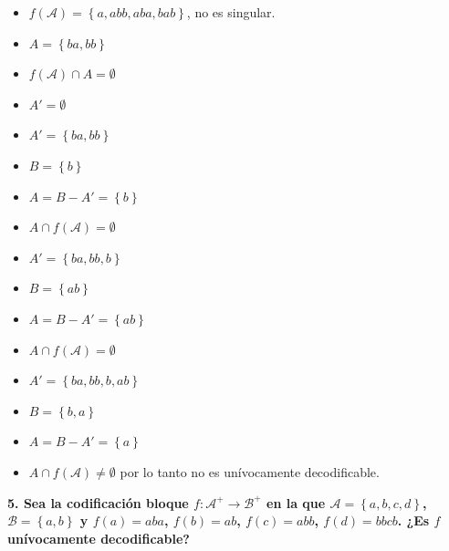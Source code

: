 \documentclass{article}
\begin{document}
\begin{itemize}
    \item $f\left(\mathcal{A}\right)=\left\{a,abb,aba,bab\right\}$, no es singular.
    \item $A=\left\{ba, bb\right\}$
    \item $f\left(\mathcal{A}\right)\cap A = \emptyset$
    \item $A'=\emptyset$
    \item $A'=\left\{ba, bb\right\}$
    \item $B = \left\{b\right\}$
    \item $A = B-A' = \left\{b\right\}$
    \item $A\cap f\left(\mathcal{A}\right) = \emptyset$
    \item $A'=\left\{ba, bb, b\right\}$
    \item $B = \left\{ab\right\}$
    \item $A = B-A' = \left\{ab\right\}$
    \item $A\cap f\left(\mathcal{A}\right) = \emptyset$
    \item $A'=\left\{ba, bb, b, ab\right\}$
    \item $B = \left\{b, a\right\}$
    \item $A = B - A' = \left\{a\right\}$
    \item $A\cap f\left(\mathcal{A}\right) \neq\emptyset$ por lo tanto no es unívocamente decodificable.
\end{itemize}

\vspace{1cm}

\textbf{
5. Sea la codificación bloque $f:\mathcal{A}^+\rightarrow\mathcal{B}^+$ en la que $\mathcal{A}=\left\{a,b,c,d\right\}$, $\mathcal{B}=\left\{a,b\right\}$ y $f(a)=aba$, $f(b) = ab$, $f(c)=abb$, $f(d)=bbcb$. ¿Es $f$ unívocamente decodificable?
}

\vspace{0.5cm}
\end{document}
